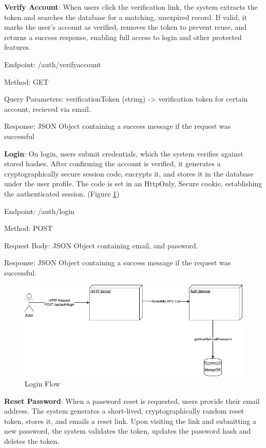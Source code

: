 \textbf{Verify Account}: When users click the verification link, the system extracts the token and searches the database for a matching, unexpired record. If valid, it marks the user’s account as verified, removes the token to prevent reuse, and returns a success response, enabling full access to login and other protected features.

Endpoint: /auth/verifyaccount

Method: GET

Query Parameters: verificationToken (string) -> verification token for certain account, recieved via email.

Response: JSON Object containing a success message if the request was successful


\textbf{Login}: On login, users submit credentials, which the system verifies against stored hashes. After confirming the account is verified, it generates a cryptographically secure session code, encrypts it, and stores it in the database under the user profile. The code is set in an HttpOnly, Secure cookie, establishing the authenticated session. (Figure \ref{fig:login-flow})

Endpoint: /auth/login

Method: POST

Request Body: JSON Object containing email, and password.

Response: JSON Object containing a success message if the request was successful.

\begin{figure}[H]
  \centering
  \includegraphics[width=1\linewidth]{licenta-login.drawio.png}
  \caption{Login Flow}
  \label{fig:login-flow}
\end{figure}

\textbf{Reset Password}: When a password reset is requested, users provide their email address. The system generates a short-lived, cryptographically random reset token, stores it, and emails a reset link. Upon visiting the link and submitting a new password, the system validates the token, updates the password hash and deletes the token.

